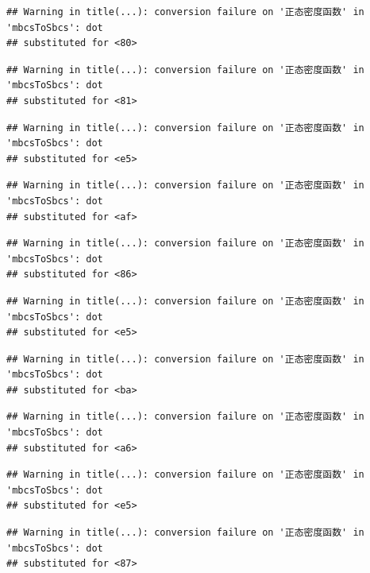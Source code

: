 \documentclass[
]{book}
\begin{document}
\begin{verbatim}
## Warning in title(...): conversion failure on '正态密度函数' in 'mbcsToSbcs': dot
## substituted for <80>
\end{verbatim}

\begin{verbatim}
## Warning in title(...): conversion failure on '正态密度函数' in 'mbcsToSbcs': dot
## substituted for <81>
\end{verbatim}

\begin{verbatim}
## Warning in title(...): conversion failure on '正态密度函数' in 'mbcsToSbcs': dot
## substituted for <e5>
\end{verbatim}

\begin{verbatim}
## Warning in title(...): conversion failure on '正态密度函数' in 'mbcsToSbcs': dot
## substituted for <af>
\end{verbatim}

\begin{verbatim}
## Warning in title(...): conversion failure on '正态密度函数' in 'mbcsToSbcs': dot
## substituted for <86>
\end{verbatim}

\begin{verbatim}
## Warning in title(...): conversion failure on '正态密度函数' in 'mbcsToSbcs': dot
## substituted for <e5>
\end{verbatim}

\begin{verbatim}
## Warning in title(...): conversion failure on '正态密度函数' in 'mbcsToSbcs': dot
## substituted for <ba>
\end{verbatim}

\begin{verbatim}
## Warning in title(...): conversion failure on '正态密度函数' in 'mbcsToSbcs': dot
## substituted for <a6>
\end{verbatim}

\begin{verbatim}
## Warning in title(...): conversion failure on '正态密度函数' in 'mbcsToSbcs': dot
## substituted for <e5>
\end{verbatim}

\begin{verbatim}
## Warning in title(...): conversion failure on '正态密度函数' in 'mbcsToSbcs': dot
## substituted for <87>
\end{verbatim}
\end{document}
